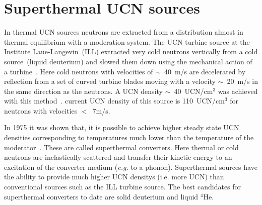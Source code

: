 


\section{Superthermal UCN sources}
\label{sec:ucn_with_heII}



In thermal UCN sources neutrons are extracted from a
distribution almost in thermal equilibrium with a moderation system.
The UCN turbine source at the Institute Laue-Langevin~(ILL) extracted
very cold neutrons vertically from a cold source~(liquid deuterium)
and slowed them down using the mechanical action of a
turbine~\cite{Steyerl1986,Steyerl1975}. Here cold neutrons
with velocities of $\sim$~40~m/s are decelerated by reflection from a
set of curved turbine blades moving with a velocity $\sim$~20~m/s in
the same direction as the neutrons. A UCN density $\sim$~40~UCN/cm$^3$
was achieved with this method~\cite{ucnbook,Albert_talk}. %
current UCN density of this source is 110~UCN/cm$^3$ for neutrons with
velocities $<$~7m/s\cite{Steyerl1986}.


In 1975 it was shown that, it is possible to achieve higher steady
state UCN densities corresponding to temperatures much lower than the
temperature of the moderator~\cite{Golub75}. These are called
superthermal converters. Here thermal or cold neutrons are
inelastically scattered and transfer their kinetic energy to an
excitation of the converter medium ({\it{e.g.}} to a phonon).
Superthermal sources have the ability to provide much higher UCN
densitys (i.e. more UCN) than conventional sources such as the ILL
turbine source.  The best candidates for superthermal converters to
date are solid deuterium and liquid $^4$He.



